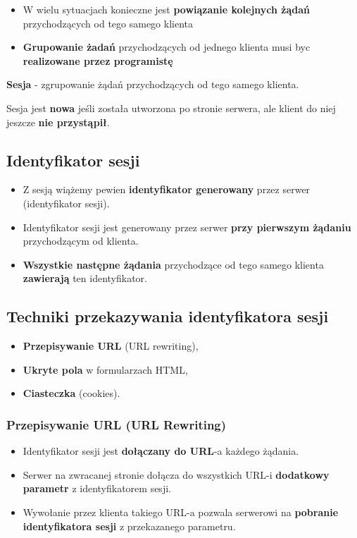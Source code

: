 \documentclass[../main.tex]{subfiles}
\begin{document}
    \begin{itemize}
        \item W wielu sytuacjach konieczne jest \textbf{powiązanie kolejnych żądań} przychodzących od tego samego klienta
        \item \textbf{Grupowanie żadań} przychodzących od jednego klienta musi byc \textbf{realizowane przez programistę}
    \end{itemize}

    \begin{theorem}
        \textbf{Sesja} - zgrupowanie żądań przychodzących od tego samego klienta.
    \end{theorem}

    \begin{theorem}
        Sesja jest \textbf{nowa} jeśli {została utworzona} po stronie serwera,
        ale klient do niej jeszcze \textbf{nie przystąpił}.
    \end{theorem}

    \subsection{Identyfikator sesji}
    \begin{itemize}
        \item Z sesją wiążemy pewien \textbf{identyfikator generowany} przez serwer (identyfikator sesji).
        \item Identyfikator sesji jest generowany przez serwer \textbf{przy pierwszym żądaniu} przychodzącym od klienta.
        \item \textbf{Wszystkie następne żądania} przychodzące od tego samego klienta \textbf{zawierają} ten identyfikator.
    \end{itemize}

    \subsection{Techniki przekazywania identyfikatora sesji}
    \begin{itemize}
        \item \textbf{Przepisywanie URL} (URL rewriting),
        \item \textbf{Ukryte pola} w formularzach HTML,
        \item \textbf{Ciasteczka} (cookies).
    \end{itemize}

    \subsubsection{Przepisywanie URL (URL Rewriting)}
    \begin{itemize}
        \item Identyfikator sesji jest \textbf{dołączany do URL}-a każdego żądania.
        \item Serwer na zwracanej stronie dołącza do wszystkich URL-i \textbf{dodatkowy parametr} z identyfikatorem sesji.
        \item Wywołanie przez klienta takiego URL-a pozwala serwerowi na \textbf{pobranie identyfikatora sesji} z przekazanego parametru.
    \end{itemize}
\end{document}
